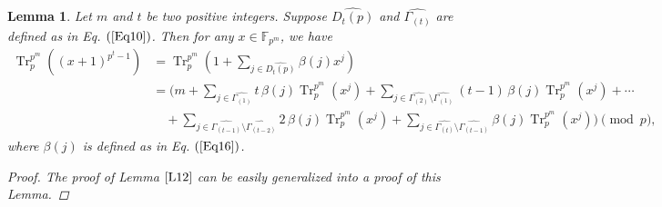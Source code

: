 \documentclass[pdflatex,sn-mathphys-num]{sn-jnl}%
\newtheorem{lemma}{Lemma}
\theoremstyle{thmstyleone}%
\theoremstyle{thmstyletwo}%
\theoremstyle{thmstylethree}%
\begin{document}
\vspace{1mm}
\begin{lemma}\label{L14}
    Let $m$ and $t$ be two positive integers. Suppose $\widehat{D_{t}(p)}$ and $\widehat{\Gamma_{(t)}}$ are defined as in Eq. $(\ref{Eq10})$. Then for any $x\in\mathbb{F}_{p^m}$, we have
    \begin{align*}
        \operatorname{Tr}_{p}^{p^m}\left((x+1)^{p^{t}-1}\right) &= \operatorname{Tr}_{p}^{p^m}\left(1+\sum_{j\in \widehat{D_{t}(p)}}\beta(j)x^{j}\right) \\
        &= \Biggl(
    m
    + \sum_{j\in\widehat{\Gamma_{(1)}}}
        t\,\beta(j)\operatorname{Tr}_{p}^{p^m}\left(x^{j}\right) 
    + \sum_{j\in\widehat{\Gamma_{(2)}}\setminus\widehat{\Gamma_{(1)}}}
        (t-1)\,\beta(j)\operatorname{Tr}_{p}^{p^m}\left(x^{j}\right)
    + \cdots \\
&\quad
    + \sum_{j\in\widehat{\Gamma_{(t-1)}}\setminus\widehat{\Gamma_{(t-2)}}}
        2\,\beta(j)\operatorname{Tr}_{p}^{p^m}\left(x^{j}\right) 
    + \sum_{j\in\widehat{\Gamma_{(t)}}\setminus\widehat{\Gamma_{(t-1)}}}
        \beta(j)\operatorname{Tr}_{p}^{p^m}\left(x^{j}\right)
\Biggr)
\pmod{p},
    \end{align*}
    where $\beta(j)$ is defined as in Eq. $(\ref{Eq16})$.
    \begin{proof}
        The proof of Lemma $\ref{L12}$ can be easily generalized into a proof of this Lemma. 
    \end{proof}
\end{lemma}
\end{document}
